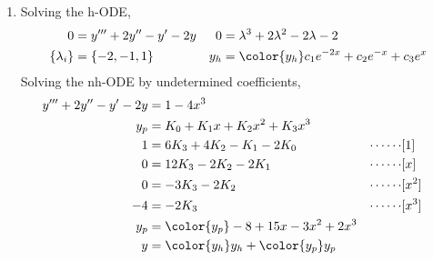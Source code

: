 \begin{enumerate}
    \item Solving the h-ODE,
          \begin{align}
              0               & = y''' + 2y'' - y' - 2y                     &
              0               & = \lambda^{3} + 2\lambda^{2} - 2\lambda - 2   \\
              \{\lambda_{i}\} & = \{-2, -1, 1\}                             &
              y_{h}           & = \color{y_h} c_{1}e^{-2x} + c_{2}e^{-x}
              + c_{3}e^{x}
          \end{align}
          Solving the nh-ODE by undetermined coefficients,
          \begin{align}
              y''' + 2y'' - y' - 2y & = 1 - 4x^{3}                                  \\
              y_{p}                 & = K_0 + K_1 x + K_2 x^{2} + K_3 x^{3}         \\
              1                     & = 6K_3 + 4K_2 - K_1 - 2K_0                  &
              \cdots\cdots          & [1]                                           \\
              0                     & = 12K_3 - 2K_2 - 2K_1                       &
              \cdots\cdots          & [x]                                           \\
              0                     & = -3K_3 -2K_2                               &
              \cdots\cdots          & [x^{2}]                                       \\
              -4                    & = -2K_3                                     &
              \cdots\cdots          & [x^{3}]                                       \\
              y_{p}                 & = \color{y_p} -8 + 15x - 3x^{2} + 2x^{3}      \\
              y                     & = {\color{y_h} y_{h}} + {\color{y_p} y_{p}}
          \end{align}


\end{enumerate}
